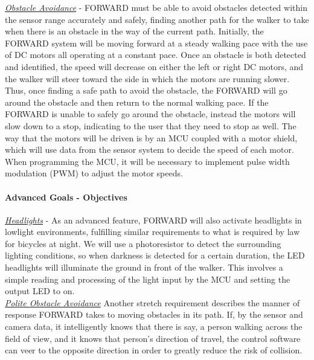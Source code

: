\noindent \underline{\textit{Obstacle Avoidance}} - FORWARD must be able to avoid obstacles detected within the sensor range accurately and safely, finding another path for the walker to take when there is an obstacle in the way of the current path. Initially, the FORWARD system will be moving forward at a steady walking pace with the use of DC motors all operating at a constant pace. Once an obstacle is both detected and identified, the speed will decrease on either the left or right DC motors, and the walker will steer toward the side in which the motors are running slower. Thus, once finding a safe path to avoid the obstacle, the FORWARD will go around the obstacle and then return to the normal walking pace. If the FORWARD is unable to safely go around the obstacle, instead the motors will slow down to a stop, indicating to the user that they need to stop as well. The way that the motors will be driven is by an MCU coupled with a motor shield, which will use data from the sensor system to decide the speed of each motor. When programming the MCU, it will be necessary to implement pulse width modulation (PWM) to adjust the motor speeds.\\


\paragraph{Advanced Goals - Objectives} 

\noindent \newline \underline{\textit{Headlights}} - As an advanced feature, FORWARD will also activate headlights in lowlight environments, fulfilling similar requirements to what is required by law for bicycles at night. We will use a photoresistor to detect the surrounding lighting conditions, so when darkness is detected for a certain duration, the LED headlights will illuminate the ground in front of the walker. This involves a simple reading and processing of the light input by the MCU and setting the output LED to on. 
\\

\noindent \underline{\textit{Polite Obstacle Avoidance}}
Another stretch requirement describes the manner of response FORWARD takes to moving obstacles in its path. If, by the sensor and camera data, it intelligently knows that there is say, a person walking across the field of view, and it knows that person's direction of travel, the control software can veer to the opposite direction in order to greatly reduce the risk of collision.\\

